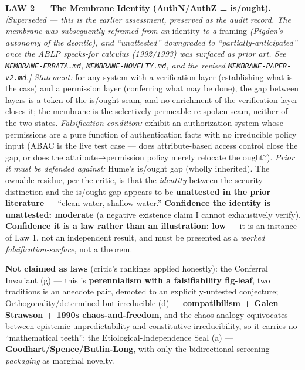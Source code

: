\documentclass[11pt]{article}
\begin{document}
\textbf{LAW 2 — The Membrane Identity (AuthN/\allowbreak{}AuthZ = is/\allowbreak{}ought).} \emph{[Superseded — this is the earlier assessment, preserved as the audit record. The membrane was subsequently reframed from an} identity \emph{to a} framing \emph{(Pigden's autonomy of the deontic), and ``unattested'' downgraded to ``partially-anticipated'' once the ABLP speaks-for calculus (1992/\allowbreak{}1993) was surfaced as prior art. See \texttt{MEMBRANE-ERRATA.md}, \texttt{MEMBRANE-NOVELTY.md}, and the revised \texttt{MEMBRANE-PAPER-v2.md}.]} \emph{Statement:} for any system with a verification layer (establishing what is the case) and a permission layer (conferring what may be done), the gap between layers is a token of the is/\allowbreak{}ought seam, and no enrichment of the verification layer closes it; the membrane is the selectively-permeable re-spoken seam, neither of the two states. \emph{Falsification condition:} exhibit an authorization system whose permissions are a pure function of authentication facts with no irreducible policy input (ABAC is the live test case — does attribute-based access control close the gap, or does the attribute→permission policy merely relocate the ought?). \emph{Prior it must be defended against:} Hume's is/\allowbreak{}ought gap (wholly inherited). The ownable residue, per the critic, is that the \emph{identity} between the security distinction and the is/\allowbreak{}ought gap appears to be \textbf{unattested in the prior literature} — ``clean water, shallow water.'' \textbf{Confidence the identity is unattested: moderate} (a negative existence claim I cannot exhaustively verify). \textbf{Confidence it is a law rather than an illustration: low} — it is an instance of Law 1, not an independent result, and must be presented as a \emph{worked falsification-surface}, not a theorem.

\textbf{Not claimed as laws} (critic's rankings applied honestly): the Conferral Invariant (g) — this is \textbf{perennialism with a falsifiability fig-leaf}, two traditions is an anecdote pair, demoted to an explicitly-untested conjecture; Orthogonality/\allowbreak{}determined-but-irreducible (d) — \textbf{compatibilism + Galen Strawson + 1990s chaos-and-freedom}, and the chaos analogy equivocates between epistemic unpredictability and constitutive irreducibility, so it carries no ``mathematical teeth''; the Etiological-Independence Seal (a) — \textbf{Goodhart/\allowbreak{}Spence/\allowbreak{}Butlin-Long}, with only the bidirectional-screening \emph{packaging} as marginal novelty.
\end{document}
